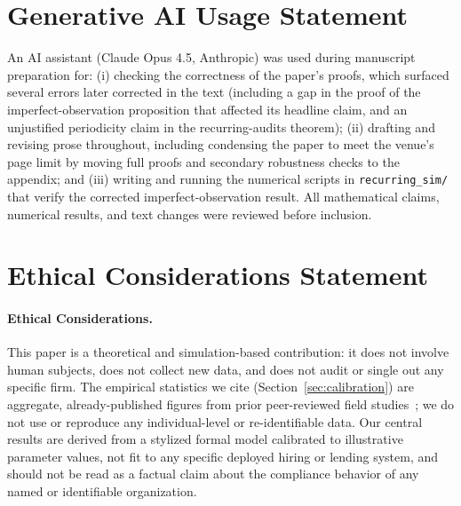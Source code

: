 \section*{Generative AI Usage Statement}
An AI assistant (Claude Opus 4.5, Anthropic) was used during manuscript preparation for: (i) checking the correctness of the paper's proofs, which surfaced several errors later corrected in the text (including a gap in the proof of the imperfect-observation proposition that affected its headline claim, and an unjustified periodicity claim in the recurring-audits theorem); (ii) drafting and revising prose throughout, including condensing the paper to meet the venue's page limit by moving full proofs and secondary robustness checks to the appendix; and (iii) writing and running the numerical scripts in \texttt{recurring\_sim/} that verify the corrected imperfect-observation result. All mathematical claims, numerical results, and text changes were reviewed before inclusion.

\section*{Ethical Considerations Statement}
\paragraph{Ethical Considerations.} This paper is a theoretical and simulation-based contribution: it does not involve human subjects, does not collect new data, and does not audit or single out any specific firm. The empirical statistics we cite (Section~\ref{sec:calibration}) are aggregate, already-published figures from prior peer-reviewed field studies~\cite{wright2024null,gerchick2025auditing}; we do not use or reproduce any individual-level or re-identifiable data. Our central results are derived from a stylized formal model calibrated to illustrative parameter values, not fit to any specific deployed hiring or lending system, and should not be read as a factual claim about the compliance behavior of any named or identifiable organization.

